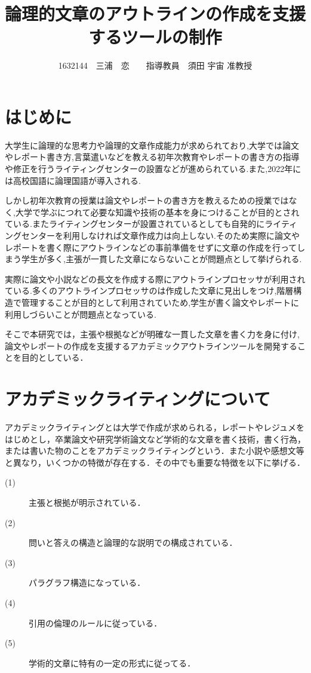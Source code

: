 \documentclass[twocolumn,10pt,a4j]{jsarticle}
\title{論理的文章のアウトラインの作成を支援するツールの制作}
\author{1632144　三浦　恋　　指導教員　須田 宇宙 准教授}
\date{}
\begin{document}
\maketitle

\section{はじめに}

大学生に論理的な思考力や論理的文章作成能力が求められており,大学では論文やレポート書き方,言葉遣いなどを教える初年次教育やレポートの書き方の指導や修正を行うライティングセンターの設置などが進められている.また,2022年には高校国語に論理国語が導入される\cite{ren00}.
　
 
しかし初年次教育の授業は論文やレポートの書き方を教えるための授業ではなく,大学で学ぶにつれて必要な知識や技術の基本を身につけることが目的とされている.またライティングセンターが設置されているとしても自発的にライティングセンターを利用しなければ文章作成力は向上しない.そのため実際に論文やレポートを書く際にアウトラインなどの事前準備をせずに文章の作成を行ってしまう学生が多く,主張が一貫した文章にならないことが問題点として挙げられる.

実際に論文や小説などの長文を作成する際にアウトラインプロセッサが利用されている.多くのアウトラインプロセッサのは作成した文章に見出しをつけ,階層構造で管理することが目的として利用されていため,学生が書く論文やレポートに利用しづらいことが問題点となっている.

そこで本研究では，主張や根拠などが明確な一貫した文章を書く力を身に付け,論文やレポートの作成を支援するアカデミックアウトラインツールを開発することを目的としている．

\section{アカデミックライティングについて}
 アカデミックライティングとは大学で作成が求められる，レポートやレジュメをはじめとし，卒業論文や研究学術論文など学術的な文章を書く技術，書く行為，または書いた物のことをアカデミックライティングという\cite{ren01}．また小説や感想文等と異なり，いくつかの特徴が存在する．その中でも重要な特徴を以下に挙げる．
\begin{description}
  \item[(1)] 主張と根拠が明示されている．
  \item[(2)] 問いと答えの構造と論理的な説明での構成されている．
  \item[(3)] パラグラフ構造になっている．
  \item[(4)] 引用の倫理のルールに従っている．
  \item[(5)] 学術的文章に特有の一定の形式に従ってる．
\end{description}
\end{document}
